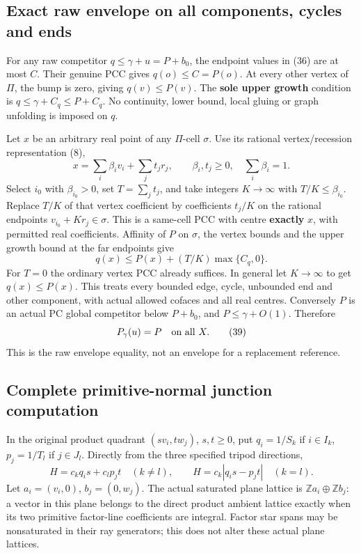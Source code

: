 \documentclass[
  11pt,
]{article}
\begin{document}
\subsection{Exact raw envelope on all components, cycles and
ends}\label{exact-raw-envelope-on-all-components-cycles-and-ends}

For any raw competitor \(q\leq\gamma+u=P+b_0\), the endpoint values in
(36) are at most \(C\). Their genuine PCC gives \(q(o)\leq C=P(o)\). At
every other vertex of \(\Pi\), the bump is zero, giving
\(q(v)\leq P(v)\). The \textbf{sole upper growth} condition is
\(q\leq\gamma+C_q\leq P+C_q\). No continuity, lower bound, local gluing
or graph unfolding is imposed on \(q\).

Let \(x\) be an arbitrary real point of any \(\Pi\)-cell \(\sigma\). Use
its rational vertex/recession representation (8), \[
 x=\sum_i\beta_iv_i+\sum_jt_jr_j,\qquad
 \beta_i,t_j\geq0,\quad\sum_i\beta_i=1.
\] Select \(i_0\) with \(\beta_{i_0}>0\), set \(T=\sum_jt_j\), and take
integers \(K\to\infty\) with \(T/K\leq\beta_{i_0}\). Replace \(T/K\) of
that vertex coefficient by coefficients \(t_j/K\) on the rational
endpoints \(v_{i_0}+Kr_j\in\sigma\). This is a same-cell PCC with centre
\textbf{exactly} \(x\), with permitted real coefficients. Affinity of
\(P\) on \(\sigma\), the vertex bounds and the upper growth bound at the
far endpoints give \[
             q(x)\leq P(x)+(T/K)\max\{C_q,0\}.               \tag{38}
\] For \(T=0\) the ordinary vertex PCC already suffices. In general let
\(K\to\infty\) to get \(q(x)\leq P(x)\). This treats every bounded edge,
cycle, unbounded end and other component, with actual allowed cofaces
and all real centres. Conversely \(P\) is an actual PC global competitor
below \(P+b_0\), and \(P\leq\gamma+O(1)\). Therefore \[
                             P_\gamma(u)=P\quad\hbox{on all }X.       \tag{39}
\] This is the raw envelope equality, not an envelope for a replacement
reference.

\subsection{Complete primitive-normal junction
computation}\label{complete-primitive-normal-junction-computation}

In the original product quadrant \((s v_i,t w_j)\), \(s,t\geq0\), put
\(q_i=1/S_k\) if \(i\in I_k\), \(p_j=1/T_l\) if \(j\in J_l\). Directly
from the three specified tripod directions, \[
 H=c_kq_i s+c_lp_j t\quad(k\ne l),\qquad
 H=c_k|q_i s-p_jt|\quad(k=l).                              \tag{40}
\] Let \(a_i=(v_i,0)\), \(b_j=(0,w_j)\). The actual saturated plane
lattice is \(\mathbb{Z}a_i\oplus\mathbb{Z}b_j\): a vector in this plane
belongs to the direct product ambient lattice exactly when its two
primitive factor-line coefficients are integral. Factor star spans may
be nonsaturated in their ray generators; this does not alter these
actual plane lattices.
\end{document}

